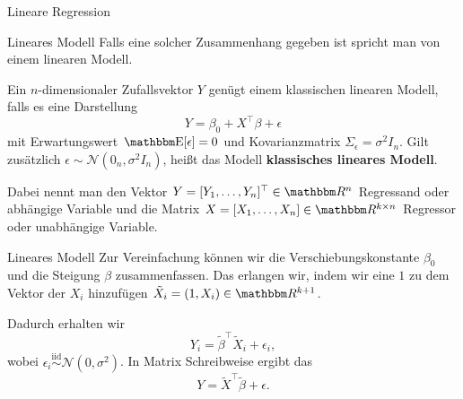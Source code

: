 \begin{frame}{Lineare Regression}
{    }
\end{frame}

\begin{frame}{Lineares Modell}
    Falls eine solcher Zusammenhang gegeben ist spricht man von einem linearen Modell.
    \pause
    \begin{definition}
        Ein $n$-dimensionaler Zufallsvektor $Y$ genügt einem klassischen linearen Modell, falls es eine Darstellung
        \begin{equation}
            Y=\beta_0 + X^\top \beta+\epsilon
        \end{equation}
        mit Erwartungswert $\Ex[\epsilon]=0$ und Kovarianzmatrix $\Sigma_\epsilon=\sigma^2I_n$.\newline
        Gilt zusätzlich $\epsilon\sim\mathcal{N}(0_n, \sigma^2I_n)$, heißt das Modell \textbf{klassisches lineares Modell}.
    \end{definition}
    Dabei nennt man den Vektor $Y=[Y_1, \dots, Y_n]^\top\in\R^n$ Regressand oder abhängige Variable und die Matrix $X=[X_1, \dots, X_n]\in\R^{k\times n}$ Regressor oder unabhängige Variable.
\end{frame}

\begin{frame}{Lineares Modell}
Zur Vereinfachung können wir die Verschiebungskonstante $\beta_0$ und die Steigung $\beta$ zusammenfassen.
Das erlangen wir, indem wir eine $1$ zu dem Vektor der $X_i$ hinzufügen $\tilde{X}_i=(1, X_i)\in\R^{k+1}$.

Dadurch erhalten wir 
$$Y_i= \tilde{\beta}^\top \tilde{X}_i+\epsilon_i,$$
wobei $\epsilon_i\overset{\mathrm{iid}}{\sim}\mathcal{N}(0, \sigma^2)$.
In Matrix Schreibweise ergibt das 
$$Y= \tilde{X}^\top \tilde{\beta}+\epsilon.$$
\end{frame}


